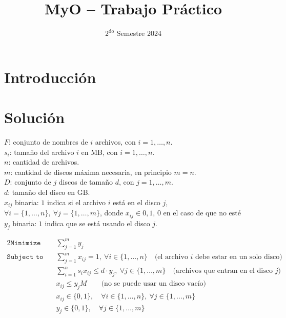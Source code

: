 \documentclass[11pt, a4paper, pdftex]{article}
\title{
	\huge MyO -- Trabajo Práctico\\
}
\author{
	\Xime \and \Mati \and \Lucifer \and \Lu
}
\date{\small $\text{2}^{\text{do}}$ Semestre 2024
}
\begin{document}
\renewcommand{\contentsname}{Contenidos}
\renewcommand{\listfigurename}{Listado de Figuras}
\renewcommand{\listtablename}{Listado de Tablas}
\renewcommand{\tablename}{Tabla}

\newcommand{\minimize}{\texttt{Minimize}\quad\,\,}
\newcommand{\maximize}{\texttt{Maximize}\quad\,\,}
\newcommand{\subjto}{\texttt{Subject to}\quad}

\maketitle

\section*{Introducción}

\section*{Solución}

$F$: conjunto de nombres de $i$ archivos, con $i = 1, \ldots, n$. \\

$s_{i}$: tamaño del archivo $i$ en MB, con $i = 1, \ldots, n$. \\

$n$: cantidad de archivos. \\

$m$: cantidad de discos máxima necesaria, en principio $m = n$. \\

$D$: conjunto de $j$ discos de tamaño $d$, con $j = 1, \ldots, m$. \\

$d$: tamaño del disco en GB. \\ 

$x_{ij}$ binaria: $1$ indica si el archivo $i$ está en el disco $j$, $\forall i = \{1, \ldots, n\},\ \forall j = \{1, \ldots, m\}$, donde $x_{ij} \in {0, 1}$, $0$ en el caso de que no esté\\

$y_{j}$ binaria: $1$ indica que se está usando el disco $j$.

\begin{alignat*}{2}
	\minimize
	& \sum_{j = 1}^{m} y_{j}\\
	\subjto
	& \sum_{j = 1}^{m} x_{ij} = 1, \ \forall i \in \{1, \ldots, n\} \quad\text{(el archivo $i$ debe estar en un solo disco)}\\
	& \sum_{i = 1}^{n} s_{i} x_{ij} \le d\cdot y_{j}, \ \forall j \in \{1, \ldots, m\} \quad\text{(archivos que entran en el disco $j$)}\\
	& x_{ij} \le y_{j}M \qquad\text{(no se puede usar un disco vacío)}\\
	& x_{ij} \in \{0,1\}, \quad \forall i \in \{1, \ldots, n\}, \ \forall j \in \{1, \ldots, m\}\\
	& y_{j} \in \{0,1\}, \quad \forall j \in \{1, \ldots, m\}
\end{alignat*}
\end{document}
